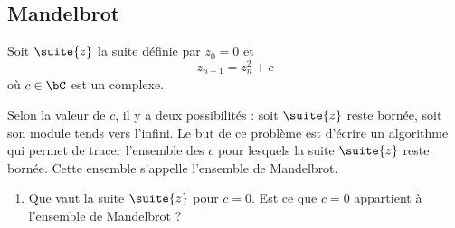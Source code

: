 \subsection{Mandelbrot}

\begin{exercice}
Soit $\suite{z}$ la suite définie par $z_0=0$ et 
$$z_{n+1} =z_n^2 +c$$
où $c\in \bC$ est un complexe. 

Selon la valeur de $c$, il y a deux possibilités : soit $\suite{z}$ reste bornée, soit son module tends vers l'infini. Le but de ce problème est d'écrire un algorithme qui permet de tracer l'ensemble des $c$ pour lesquels la suite $\suite{z}$ reste bornée. Cette ensemble s'appelle l'ensemble de Mandelbrot. 
\begin{enumerate}
\item Que vaut la suite $\suite{z}$ pour $c=0$. Est ce que $c=0$ appartient à l'ensemble de Mandelbrot ?


\end{enumerate}
\end{exercice}
